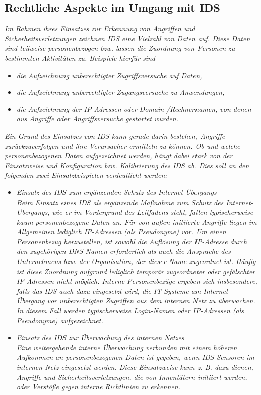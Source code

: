 \documentclass[11pt]{scrartcl}
\begin{document}
\subsection{Rechtliche Aspekte im Umgang mit IDS}
\label{sec:law ids}
\grqq{}\textit{Im Rahmen ihres Einsatzes zur Erkennung von Angriffen und Sicherheitsverletzungen zeichnen IDS eine Vielzahl von Daten auf. Diese Daten sind teilweise personenbezogen bzw. lassen die Zuordnung von Personen zu bestimmten Aktivitäten zu. Beispiele hierfür sind}
\begin{itemize}
\item \textit{die Aufzeichnung unberechtigter Zugriffsversuche auf Daten,}
\item \textit{die Aufzeichnung unberechtigter Zugangsversuche zu Anwendungen,}
\item \textit{die Aufzeichnung der IP-Adressen oder Domain-/Rechnernamen, von denen aus Angriffe oder Angriffsversuche gestartet wurden.}\\
\end{itemize}
\textit{Ein Grund des Einsatzes von IDS kann gerade darin bestehen, Angriffe zurückzuverfolgen und ihre Verursacher ermitteln zu können. Ob und welche personenbezogenen Daten aufgezeichnet werden, hängt dabei stark von der Einsatzweise und Konfiguration bzw. Kalibrierung des IDS ab. Dies soll an den folgenden zwei Einsatzbeispielen verdeutlicht werden:}
\begin{itemize}
\item \textit{Einsatz des IDS zum ergänzenden Schutz des Internet-Übergangs}\\

\textit{Beim Einsatz eines IDS als ergänzende Maßnahme zum Schutz des Internet-Übergangs, wie er im Vordergrund des Leitfadens steht, fallen typischerweise kaum personenbezogene Daten an. Für von außen initiierte Angriffe liegen im Allgemeinen lediglich IP-Adressen (als Pseudonyme) vor. Um einen Personenbezug herzustellen, ist sowohl die Auflösung der IP-Adresse durch den zugehörigen DNS-Namen erforderlich als auch die Ansprache des Unternehmens bzw. der Organisation, der dieser Name zugeordnet ist. Häufig ist diese Zuordnung aufgrund lediglich temporär zugeordneter oder gefälschter IP-Adressen nicht möglich. Interne Personenbezüge ergeben sich insbesondere, falls das IDS auch dazu eingesetzt wird, die IT-Systeme am Internet-Übergang vor unberechtigten Zugriffen aus dem internen Netz zu überwachen. In diesem Fall werden typischerweise Login-Namen oder IP-Adressen (als Pseudonyme) aufgezeichnet.}
\item \textit{Einsatz des IDS zur Überwachung des internen Netzes}\\

\textit{Eine weitergehende interne Überwachung verbunden mit einem höheren Aufkommen an personenbezogenen Daten ist gegeben, wenn IDS-Sensoren im internen Netz eingesetzt werden. Diese Einsatzweise kann z. B. dazu dienen, Angriffe und Sicherheitsverletzungen, die von Innentätern initiiert werden, oder Verstöße gegen interne Richtlinien zu erkennen.}\\
\end{itemize}
\end{document}
